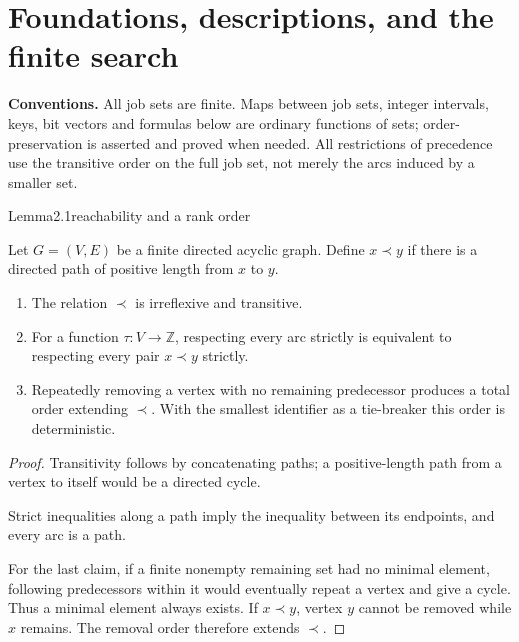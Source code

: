 \section{Foundations, descriptions, and the finite search}

\textbf{Conventions.} All job sets are finite. Maps between job sets, integer intervals, keys, bit vectors and formulas below are ordinary functions of sets; order-preservation is asserted and proved when needed. All restrictions of precedence use the transitive order on the full job set, not merely the arcs induced by a smaller set.

\begin{numbered}{Lemma}{2.1}{reachability and a rank order}

Let \(G=(V,E)\) be a finite directed acyclic graph. Define \(x\prec y\) if there is a directed path of positive length from \(x\) to \(y\).

\begin{enumerate}
\def\labelenumi{\arabic{enumi}.}
\tightlist
\item
  The relation \(\prec\) is irreflexive and transitive.
\item
  For a function \(\tau:V\to\mathbb Z\), respecting every arc strictly is equivalent to respecting every pair \(x\prec y\) strictly.
\item
  Repeatedly removing a vertex with no remaining predecessor produces a total order extending \(\prec\). With the smallest identifier as a tie-breaker this order is deterministic.
\end{enumerate}

\end{numbered}

\begin{proof}
Transitivity follows by concatenating paths; a positive-length path from a vertex to itself would be a directed cycle.

Strict inequalities along a path imply the inequality between its endpoints, and every arc is a path.

For the last claim, if a finite nonempty remaining set had no minimal element, following predecessors within it would eventually repeat a vertex and give a cycle. Thus a minimal element always exists. If \(x\prec y\), vertex \(y\) cannot be removed while \(x\) remains. The removal order therefore extends \(\prec\).
\end{proof}


